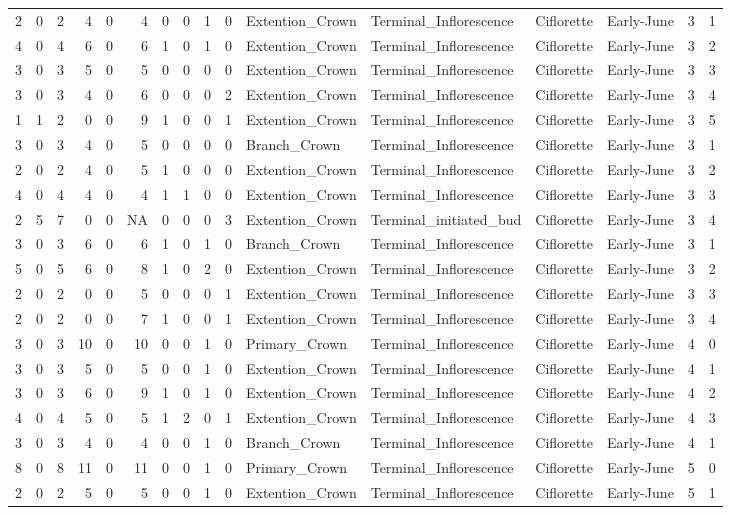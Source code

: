 \documentclass[]{article}
\begin{document}
\begin{longtable}[]{@{}rrrrrrrrrrllllrl@{}}
2 & 0 & 2 & 4 & 0 & 4 & 0 & 0 & 1 & 0 & Extention\_Crown &
Terminal\_Inflorescence & Ciflorette & Early-June & 3 & 1\tabularnewline
4 & 0 & 4 & 6 & 0 & 6 & 1 & 0 & 1 & 0 & Extention\_Crown &
Terminal\_Inflorescence & Ciflorette & Early-June & 3 & 2\tabularnewline
3 & 0 & 3 & 5 & 0 & 5 & 0 & 0 & 0 & 0 & Extention\_Crown &
Terminal\_Inflorescence & Ciflorette & Early-June & 3 & 3\tabularnewline
3 & 0 & 3 & 4 & 0 & 6 & 0 & 0 & 0 & 2 & Extention\_Crown &
Terminal\_Inflorescence & Ciflorette & Early-June & 3 & 4\tabularnewline
1 & 1 & 2 & 0 & 0 & 9 & 1 & 0 & 0 & 1 & Extention\_Crown &
Terminal\_Inflorescence & Ciflorette & Early-June & 3 & 5\tabularnewline
3 & 0 & 3 & 4 & 0 & 5 & 0 & 0 & 0 & 0 & Branch\_Crown &
Terminal\_Inflorescence & Ciflorette & Early-June & 3 & 1\tabularnewline
2 & 0 & 2 & 4 & 0 & 5 & 1 & 0 & 0 & 0 & Extention\_Crown &
Terminal\_Inflorescence & Ciflorette & Early-June & 3 & 2\tabularnewline
4 & 0 & 4 & 4 & 0 & 4 & 1 & 1 & 0 & 0 & Extention\_Crown &
Terminal\_Inflorescence & Ciflorette & Early-June & 3 & 3\tabularnewline
2 & 5 & 7 & 0 & 0 & NA & 0 & 0 & 0 & 3 & Extention\_Crown &
Terminal\_initiated\_bud & Ciflorette & Early-June & 3 &
4\tabularnewline
3 & 0 & 3 & 6 & 0 & 6 & 1 & 0 & 1 & 0 & Branch\_Crown &
Terminal\_Inflorescence & Ciflorette & Early-June & 3 & 1\tabularnewline
5 & 0 & 5 & 6 & 0 & 8 & 1 & 0 & 2 & 0 & Extention\_Crown &
Terminal\_Inflorescence & Ciflorette & Early-June & 3 & 2\tabularnewline
2 & 0 & 2 & 0 & 0 & 5 & 0 & 0 & 0 & 1 & Extention\_Crown &
Terminal\_Inflorescence & Ciflorette & Early-June & 3 & 3\tabularnewline
2 & 0 & 2 & 0 & 0 & 7 & 1 & 0 & 0 & 1 & Extention\_Crown &
Terminal\_Inflorescence & Ciflorette & Early-June & 3 & 4\tabularnewline
3 & 0 & 3 & 10 & 0 & 10 & 0 & 0 & 1 & 0 & Primary\_Crown &
Terminal\_Inflorescence & Ciflorette & Early-June & 4 & 0\tabularnewline
3 & 0 & 3 & 5 & 0 & 5 & 0 & 0 & 1 & 0 & Extention\_Crown &
Terminal\_Inflorescence & Ciflorette & Early-June & 4 & 1\tabularnewline
3 & 0 & 3 & 6 & 0 & 9 & 1 & 0 & 1 & 0 & Extention\_Crown &
Terminal\_Inflorescence & Ciflorette & Early-June & 4 & 2\tabularnewline
4 & 0 & 4 & 5 & 0 & 5 & 1 & 2 & 0 & 1 & Extention\_Crown &
Terminal\_Inflorescence & Ciflorette & Early-June & 4 & 3\tabularnewline
3 & 0 & 3 & 4 & 0 & 4 & 0 & 0 & 1 & 0 & Branch\_Crown &
Terminal\_Inflorescence & Ciflorette & Early-June & 4 & 1\tabularnewline
8 & 0 & 8 & 11 & 0 & 11 & 0 & 0 & 1 & 0 & Primary\_Crown &
Terminal\_Inflorescence & Ciflorette & Early-June & 5 & 0\tabularnewline
2 & 0 & 2 & 5 & 0 & 5 & 0 & 0 & 1 & 0 & Extention\_Crown &
Terminal\_Inflorescence & Ciflorette & Early-June & 5 & 1\tabularnewline

\end{longtable}
\end{document}
